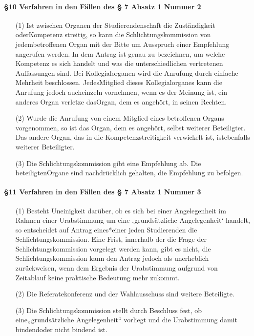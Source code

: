         \paragraph{§10 Verfahren in den Fällen des § 7 Absatz 1 Nummer 2}
            \begin{itemize}
                \item[(1)] Ist zwischen Organen der Studierendenschaft die Zuständigkeit oderKompetenz streitig, so kann die Schlichtungskommission von jedembetroffenen Organ mit der Bitte um Ausspruch einer Empfehlung angerufen werden. In dem Antrag ist genau zu bezeichnen, um welche Kompetenz es sich handelt und was die unterschiedlichen vertretenen Auffassungen sind. Bei Kollegialorganen wird die Anrufung durch einfache Mehrheit beschlossen. JedesMitglied dieses Kollegialorganes kann die Anrufung jedoch aucheinzeln vornehmen, wenn es der Meinung ist, ein anderes Organ verletze dasOrgan, dem es angehört, in seinen Rechten.
                \item[(2)] Wurde die Anrufung von einem Mitglied eines betroffenen Organs vorgenommen, so ist das Organ, dem es angehört, selbst weiterer Beteiligter. Das andere Organ, das in die Kompetenzstreitigkeit verwickelt ist, istebenfalls weiterer Beteiligter.
                \item[(3)] Die Schlichtungskommission gibt eine Empfehlung ab. Die beteiligtenOrgane sind nachdrücklich gehalten, die Empfehlung zu befolgen.
            \end{itemize}
        \paragraph{§11 Verfahren in den Fällen des § 7 Absatz 1 Nummer 3}
            \begin{itemize}
                \item[(1)]Besteht Uneinigkeit darüber, ob es sich bei einer Angelegenheit im Rahmen einer Urabstimmung um eine ‚grundsätzliche Angelegenheit‘ handelt, so entscheidet auf Antrag eines*einer jeden Studierenden die Schlichtungskommission. Eine Frist, innerhalb der die Frage der Schlichtungskommission vorgelegt werden kann, gibt es nicht, die Schlichtungskommission kann den Antrag jedoch als unerheblich zurückweisen, wenn dem Ergebnis der Urabstimmung aufgrund von Zeitablauf keine praktische Bedeutung mehr zukommt.
                \item[(2)]Die Referatekonferenz und der Wahlausschuss sind weitere Beteiligte.
                \item[(3)]Die Schlichtungskommission stellt durch Beschluss fest, ob eine„grundsätzliche Angelegenheit“ vorliegt und die Urabstimmung damit bindendoder nicht bindend ist.
            \end{itemize}    

